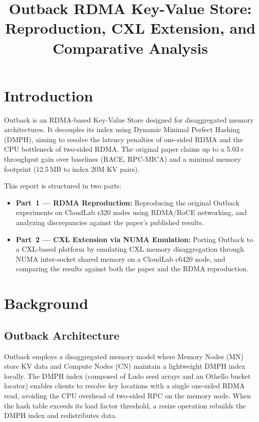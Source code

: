 \documentclass[11pt,a4paper]{article}
\title{
  \vspace{-1cm}
  \textbf{Outback RDMA Key-Value Store:\\
  Reproduction, CXL Extension, and Comparative Analysis}
}
\author{}
\date{}
\begin{document}
\maketitle
\thispagestyle{fancy}

\section{Introduction}

Outback is an RDMA-based Key-Value Store designed for disaggregated memory architectures. It decouples its index using Dynamic Minimal Perfect Hashing (DMPH), aiming to resolve the latency penalties of one-sided RDMA and the CPU bottleneck of two-sided RDMA. The original paper claims up to a 5.03$\times$ throughput gain over baselines (RACE, RPC-MICA) and a minimal memory footprint (12.5\,MB to index 20M KV pairs).

This report is structured in two parts:
\begin{itemize}[nosep]
  \item \textbf{Part~1 --- RDMA Reproduction:} Reproducing the original Outback experiments on CloudLab r320 nodes using RDMA/RoCE networking, and analyzing discrepancies against the paper's published results.
  \item \textbf{Part~2 --- CXL Extension via NUMA Emulation:} Porting Outback to a CXL-based platform by emulating CXL memory disaggregation through NUMA inter-socket shared memory on a CloudLab c6420 node, and comparing the results against both the paper and the RDMA reproduction.
\end{itemize}

\section{Background}

\subsection{Outback Architecture}

Outback employs a disaggregated memory model where Memory Nodes (MN) store KV data and Compute Nodes (CN) maintain a lightweight DMPH index locally. The DMPH index (composed of Ludo seed arrays and an Othello bucket locator) enables clients to resolve key locations with a single one-sided RDMA read, avoiding the CPU overhead of two-sided RPC on the memory node. When the hash table exceeds its load factor threshold, a resize operation rebuilds the DMPH index and redistributes data.
\end{document}
